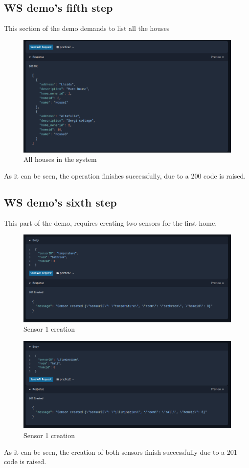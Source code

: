 \documentclass[a4paper,12pt]{article}
\begin{document}
\subsection*{WS demo's fifth step}
This section of the demo demands to list all the houses
\begin{figure}[H]
    \centering
    \includegraphics[scale = 0.5]{images/List all houses.png}
    \caption{All houses in the system}
    \label{fig:allhouses}
\end{figure}
As it can be seen, the operation finishes successfully, due to a 200 code is raised.
\subsection*{WS demo's sixth step}
This part of the demo, requires creating two sensors for the first home.
\begin{figure}[H]
    \centering
    \includegraphics[scale = 0.5]{images/Sensor 1 created.png}
    \caption{Sensor 1 creation}
    \label{fig:sensor1C}
\end{figure}
\begin{figure}[H]
    \centering
    \includegraphics[scale = 0.5]{images/Sensor 2 created.png}
    \caption{Sensor 1 creation}
    \label{fig:sensor1C}
\end{figure}
As it can be seen, the creation of both sensors finish successfully due to a 201 code is raised.
\end{document}
